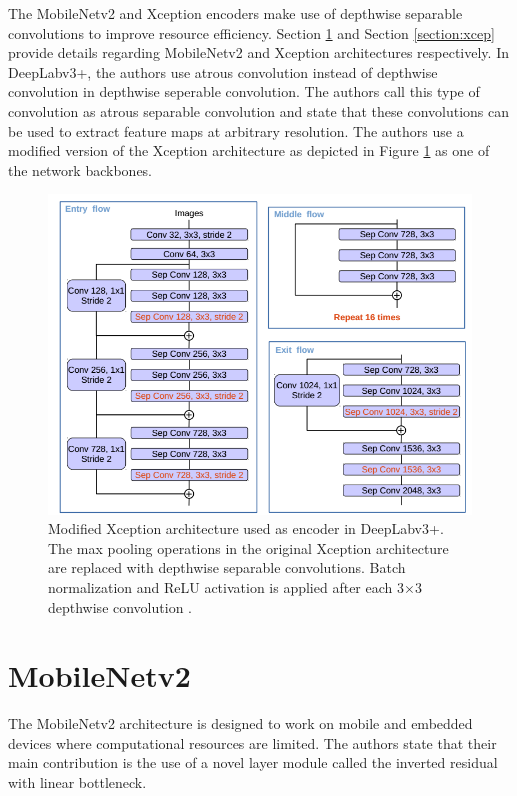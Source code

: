 The MobileNetv2 and Xception encoders make use of depthwise separable convolutions to improve resource efficiency. Section \ref{section:mn} and Section \ref{section:xcep} provide details regarding MobileNetv2 and Xception architectures respectively. In DeepLabv3+, the authors use atrous convolution instead of depthwise convolution in depthwise seperable convolution. The authors call this type of convolution as atrous separable convolution and state that these convolutions can be used to extract feature maps at arbitrary resolution. The authors use a modified version of the Xception architecture as depicted in Figure \ref{Fig:deepLabv4_xcep} as one of the network backbones.

	\begin{figure}
		\centering
		\includegraphics[width=.8\linewidth]{images/deepLabv4_xcep}
		\caption{Modified Xception architecture used as encoder in DeepLabv3+. The max pooling operations in the original Xception architecture are replaced with depthwise separable convolutions. Batch normalization and ReLU activation is applied after each 3$\times$3 depthwise convolution \cite{DBLP:journals/corr/abs-1802-02611}.}
		\label{Fig:deepLabv4_xcep}
	\end{figure}

\section{MobileNetv2}
\label{section:mn}


The MobileNetv2 architecture is designed to work on mobile and embedded devices where computational resources are limited. The authors state that their main contribution is the use of a novel layer module called the inverted residual with linear bottleneck. 

